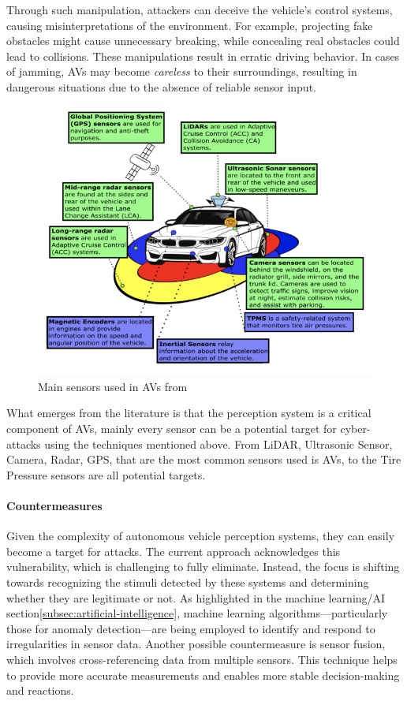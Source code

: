 Through such manipulation, attackers can deceive the vehicle's control systems, causing misinterpretations of the environment.
For example, projecting fake obstacles might cause unnecessary breaking, while concealing real obstacles could lead to collisions.
These manipulations result in erratic driving behavior.
In cases of jamming, AVs may become \textit{careless} to their surroundings, resulting in dangerous situations due to the absence of reliable sensor input\cite{durlik2022cybersecurity}.

\begin{figure}[!htb]
    \centering
    \includegraphics[width=0.7\linewidth]{figures/sensors}
    \caption{Main sensors used in AVs from \cite{sensors}}
    \label{fig:sensors-2}
\end{figure}

What emerges from the literature is that the perception system is a critical component of AVs, mainly every sensor can be a potential target for cyber-attacks using the techniques mentioned above.
From LiDAR, Ultrasonic Sensor, Camera, Radar, GPS, that are the most common sensors used is AVs, to the Tire Pressure sensors are all potential targets\cite{sensors}.


\paragraph{Countermeasures}

Given the complexity of autonomous vehicle perception systems, they can easily become a target for attacks.
The current approach acknowledges this vulnerability, which is challenging to fully eliminate.
Instead, the focus is shifting towards recognizing the stimuli detected by these systems and determining whether they are legitimate or not.
As highlighted in the machine learning/AI section\ref{subsec:artificial-intelligence}, machine learning algorithms—particularly those for anomaly detection—are being employed to identify and respond to irregularities in sensor data.
Another possible countermeasure is sensor fusion, which involves cross-referencing data from multiple sensors.
This technique helps to provide more accurate measurements and enables more stable decision-making and reactions.

